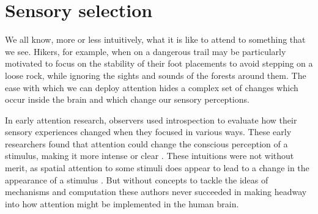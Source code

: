 
\section{Sensory selection}

We all know, more or less intuitively, what it is like to attend to something that we see. Hikers, for example, when on a dangerous trail may be particularly motivated to focus on the stability of their foot placements to avoid stepping on a loose rock, while ignoring the sights and sounds of the forests around them. The ease with which we can deploy attention hides a complex set of changes which occur inside the brain and which change our sensory perceptions.

In early attention research, observers used introspection to evaluate how their sensory experiences changed when they focused in various ways. These early researchers found that attention could change the conscious perception of a stimulus, making it more intense or clear \citep{Helmholtz1924-rl,James1981-cj,Kuelpe1902-qz,Titchener1908-bx}. These intuitions were not without merit, as spatial attention to some stimuli does appear to lead to a change in the appearance of a stimulus \citep{Carrasco2018-sb}. But without concepts to tackle the ideas of mechanisms and computation these authors never succeeded in making headway into how attention might be implemented in the human brain. 

